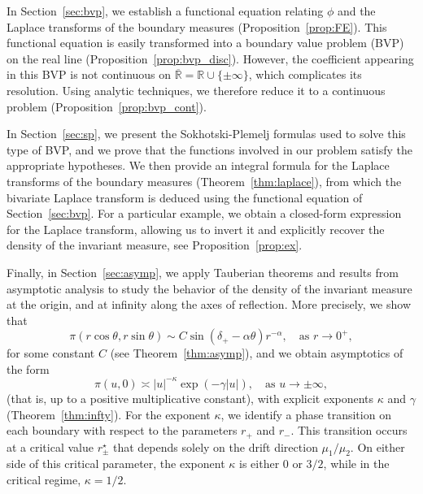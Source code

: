 \documentclass{article}
\theoremstyle{plain}
\theoremstyle{definition}
\theoremstyle{remark}
\begin{document}
In Section~\ref{sec:bvp}, we establish a functional equation relating $\phi$ and the Laplace transforms of the boundary measures (Proposition~\ref{prop:FE}). This functional equation is easily transformed into a boundary value problem (BVP) on the real line (Proposition~\ref{prop:bvp_disc}). However, the coefficient appearing in this BVP is not continuous on $\overline{\mathbb{R}}=\mathbb{R}\cup\{\pm \infty\}$, which complicates its resolution. Using analytic techniques, we therefore reduce it to a continuous problem (Proposition~\ref{prop:bvp_cont}).

In Section~\ref{sec:sp}, we present the Sokhotski-Plemelj formulas used to solve this type of BVP, and we prove that the functions involved in our problem satisfy the appropriate hypotheses. We then provide an integral formula for the Laplace transforms of the boundary measures (Theorem~\ref{thm:laplace}), from which the bivariate Laplace transform is deduced using the functional equation of Section~\ref{sec:bvp}. For a particular example, we obtain a closed-form expression for the Laplace transform, allowing us to invert it and explicitly recover the density of the invariant measure, see Proposition~\ref{prop:ex}.

Finally, in Section~\ref{sec:asymp}, we apply Tauberian theorems and results from asymptotic analysis to study the behavior of the density of the invariant measure at the origin, and at infinity along the axes of reflection. More precisely, we show that
$$\pi(r\cos \theta,r\sin\theta)\sim C\sin\left(\delta_+-\alpha\theta\right)r^{-\alpha},\quad \text{as }r\to 0^+,$$
for some constant $C$ (see Theorem~\ref{thm:asymp}), and we obtain asymptotics of the form $$\pi(u,0)\asymp |u|^{-\kappa}\exp(-\gamma |u|),\quad \text{as }u\to\pm\infty,$$ (that is, up to a positive multiplicative constant), with explicit exponents $\kappa$ and $\gamma$ (Theorem~\ref{thm:infty}). For the exponent $\kappa$, we identify a phase transition on each boundary with respect to the parameters $r_+$ and $r_-$. This transition occurs at a critical value $r_\pm^\star$ that depends solely on the drift direction $\mu_1/\mu_2$. On either side of this critical parameter, the exponent $\kappa$ is either $0$ or $3/2$, while in the critical regime, $\kappa=1/2$.
\end{document}
